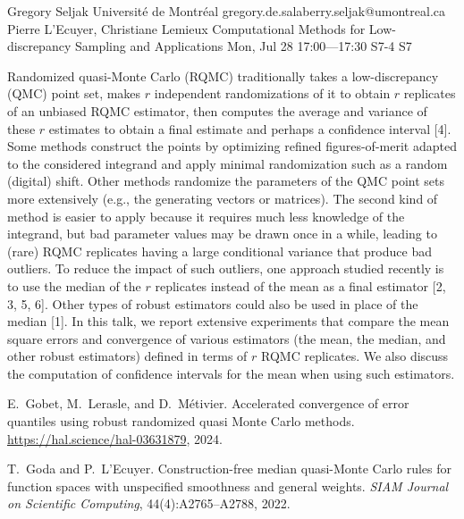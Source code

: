 \begin{talk}
  {Gregory Seljak}%
  {Universit\'e de Montr\'eal}%
  {gregory.de.salaberry.seljak@umontreal.ca}%
  {Pierre L'Ecuyer, Christiane Lemieux}%
  {Computational Methods for Low-discrepancy Sampling and Applications}%
  {}%
  {Mon, Jul 28 17:00---17:30}%
  {S7-4}%
  {S7}%

\medskip

Randomized quasi-Monte Carlo (RQMC) traditionally takes a low-discrepancy (QMC) point set,
makes $r$ independent randomizations of it to obtain $r$ replicates of an unbiased RQMC estimator, 
then computes the average and variance of these $r$ estimates to obtain a final estimate 
and perhaps a confidence interval [4]. 
Some methods construct the points by optimizing refined figures-of-merit adapted to the considered integrand
and apply minimal randomization such as a random (digital) shift.  Other methods randomize
the parameters of the QMC point sets more extensively (e.g., the generating vectors or matrices).
The second kind of method is easier to apply because it requires much less knowledge of the integrand,
but bad parameter values may be drawn once in a while, leading to (rare) RQMC replicates having 
a large conditional variance that produce bad outliers.
To reduce the impact of such outliers, one approach studied recently is to use the median 
of the $r$ replicates instead of the mean as a final estimator [2, 3, 5, 6].
Other types of robust estimators could also be used in place of the median [1].
In this talk, we report extensive experiments that compare the mean square errors 
and convergence of various estimators (the mean, the median, and other robust estimators) 
defined in terms of $r$ RQMC replicates.
We also discuss the computation of confidence intervals for the mean when using such estimators.

{
%
\item
E.~Gobet, M.~Lerasle, and D.~M{\'e}tivier.
Accelerated convergence of error quantiles using robust randomized
  quasi {Monte Carlo} methods.
\url{https://hal.science/hal-03631879}, 2024.

\item
T.~Goda and P.~L'Ecuyer.
Construction-free median quasi-{Monte Carlo} rules for function
  spaces with unspecified smoothness and general weights.
{\em {SIAM} Journal on Scientific Computing}, 44(4):A2765--A2788, 2022.

}
\end{talk}
